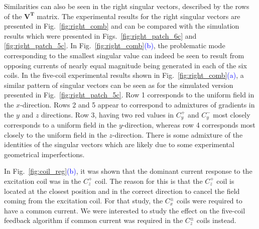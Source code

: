 
Similarities can also be seen in the right singular vectors, described
by the rows of the $\bm{V^T}$ matrix.  The experimental results for
the right singular vectors are presented in Fig.~\ref{fig:right_comb}
and can be compared with the simulation results which were presented
in Figs.~\ref{fig:right_patch_6c} and \ref{fig:right_patch_5c}.  In
Fig.~\ref{fig:right_comb}\textcolor{blue}{(b)}, the problematic mode
corresponding to the smallest singular value can indeed be seen to
result from opposing currents of nearly equal magnitude being
generated in each of the six coils.  In the five-coil experimental
results shown in Fig.~\ref{fig:right_comb}\textcolor{blue}{(a)}, a similar pattern of singular vectors
can be seen as for the simulated version presented in
Fig.~\ref{fig:right_patch_5c}.  Row 1 corresponds to the uniform field
in the $x$-direction.  Rows 2 and 5 appear to correspond to admixtures
of gradients in the $y$ and $z$ directions.  Row 3, having two red
values in $C_y^+$ and $C_y^-$ most closely corresponds to a uniform
field in the $y$-direction, whereas row 4 corresponds most closely to
the uniform field in the $z$-direction.  There is some admixture of
the identities of the singular vectors which are likely due to some
experimental geometrical imperfections.




In Fig.~\ref{fig:coil_reg}\textcolor{blue}{(b)}, it was shown that the dominant current
response to the excitation coil was in the $C_z^+$ coil.  The reason
for this is that the $C_z^+$ coil is located at the closest position
and in the correct direction to cancel the field coming from the
excitation coil.  For that study, the $C_x^\pm$ coils were required to
have a common current.  We were interested to study the effect on the
five-coil feedback algorithm if common current was required in the
$C_z^\pm$ coils instead.

